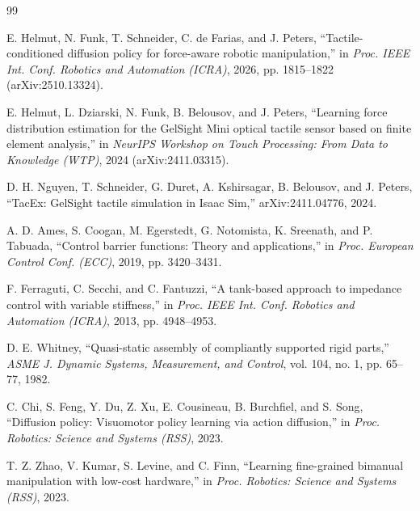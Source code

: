 \documentclass[letterpaper,10pt,conference]{IEEEtran}
\begin{document}
\clearpage
\begin{thebibliography}{99}

E. Helmut, N. Funk, T. Schneider, C. de Farias, and J. Peters, ``Tactile-conditioned diffusion policy for force-aware robotic manipulation,'' in \emph{Proc. IEEE Int. Conf. Robotics and Automation (ICRA)}, 2026, pp. 1815--1822 (arXiv:2510.13324).

E. Helmut, L. Dziarski, N. Funk, B. Belousov, and J. Peters, ``Learning force distribution estimation for the GelSight Mini optical tactile sensor based on finite element analysis,'' in \emph{NeurIPS Workshop on Touch Processing: From Data to Knowledge (WTP)}, 2024 (arXiv:2411.03315).

D. H. Nguyen, T. Schneider, G. Duret, A. Kshirsagar, B. Belousov, and J. Peters, ``TacEx: GelSight tactile simulation in Isaac Sim,'' arXiv:2411.04776, 2024.

A. D. Ames, S. Coogan, M. Egerstedt, G. Notomista, K. Sreenath, and P. Tabuada, ``Control barrier functions: Theory and applications,'' in \emph{Proc. European Control Conf. (ECC)}, 2019, pp. 3420--3431.

F. Ferraguti, C. Secchi, and C. Fantuzzi, ``A tank-based approach to impedance control with variable stiffness,'' in \emph{Proc. IEEE Int. Conf. Robotics and Automation (ICRA)}, 2013, pp. 4948--4953.

D. E. Whitney, ``Quasi-static assembly of compliantly supported rigid parts,'' \emph{ASME J. Dynamic Systems, Measurement, and Control}, vol. 104, no. 1, pp. 65--77, 1982.

C. Chi, S. Feng, Y. Du, Z. Xu, E. Cousineau, B. Burchfiel, and S. Song, ``Diffusion policy: Visuomotor policy learning via action diffusion,'' in \emph{Proc. Robotics: Science and Systems (RSS)}, 2023.

T. Z. Zhao, V. Kumar, S. Levine, and C. Finn, ``Learning fine-grained bimanual manipulation with low-cost hardware,'' in \emph{Proc. Robotics: Science and Systems (RSS)}, 2023.



\end{thebibliography}
\end{document}
